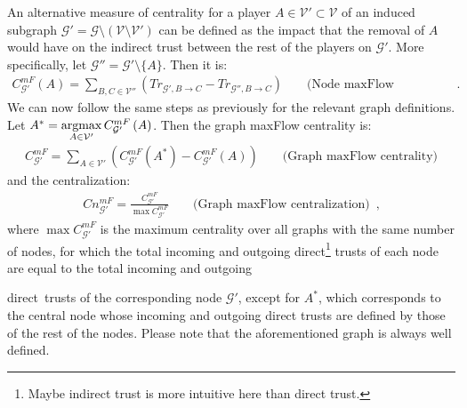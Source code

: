     An alternative measure of centrality for a player $A \in \mathcal{V}' \subset \mathcal{V}$ of an induced subgraph
    $\mathcal{G}' = \mathcal{G} \setminus \left(\mathcal{V} \setminus \mathcal{V}'\right)$ can be defined as the impact that
    the removal of $A$ would have on the indirect trust between the rest of the players on $\mathcal{G}'$. More specifically,
    let $\mathcal{G}'' = \mathcal{G}' \setminus \{A\}$. Then it is:
    \begin{align*}
      C^{mF}_{\mathcal{G}'}\left(A\right) = \sum\limits_{B,C \in \mathcal{V}''}\left(Tr_{\mathcal{G}', B \rightarrow C} -
      Tr_{\mathcal{G}'', B \rightarrow C}\right) && \mbox{ (Node maxFlow centrality)} \enspace.
    \end{align*}
    We can now follow the same steps as previously for the relevant graph definitions. Let $A^* = \operatorname*{argmax}\limits_{A \in
    \mathcal{V}'}C^{mF}_{\mathcal{G}'}\left(A\right)$. Then the graph maxFlow centrality is:
    \begin{align*}
      C^{mF}_{\mathcal{G}'} = \sum\limits_{A \in \mathcal{V}'}\left(C^{mF}_{\mathcal{G}'}\left(A^*\right) -
      C^{mF}_{\mathcal{G}'}\left(A\right)\right) && \mbox{ (Graph maxFlow centrality)}
    \end{align*}
    and the centralization:
    \begin{align*}
      Cn^{mF}_{\mathcal{G}'} = \frac{C^{mF}_{\mathcal{G}'}}{\max C^{mF}_{\mathcal{G}'}} && \mbox{ (Graph maxFlow
      centralization)} \enspace,
    \end{align*}
    where $\max C^{mF}_{\mathcal{G}'}$ is the maximum centrality over all graphs with the same number of nodes, for which the
    total incoming and outgoing direct\footnote{Maybe indirect trust is more intuitive here than direct trust.} trusts of each
    node are equal to the total incoming and outgoing \addtocounter{footnote}{-1} direct\footnotemark \ trusts of the
    corresponding node $\mathcal{G}'$, except for $A^*$, which corresponds to the central node whose incoming and outgoing
    direct trusts are defined by those of the rest of the nodes. Please note that the aforementioned graph is always well
    defined.
